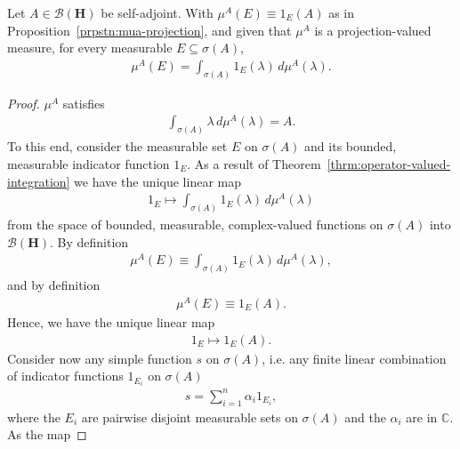 \begin{proposition}
    \label{prpstn:mua-indicator-integral}
    \leanok
    Let $A \in \mathcal{B}(\mathbf{H})$ be self-adjoint. With $\mu^A(E) \equiv 1_E(A)$ as in Proposition~\ref{prpstn:mua-projection}, and given that $\mu^A$ is a projection-valued measure, for every measurable $E \subseteq \sigma(A)$,
    \begin{align}
        \mu^A(E) = \int_{\sigma(A)} 1_E(\lambda) \, d\mu^A(\lambda).
    \end{align}
\end{proposition}
\begin{proof}
    \leanok
$\mu^A$ satisfies
\begin{align}
    \int_{\sigma(A)} \lambda \, d\mu^A(\lambda) = A.
\end{align}
To this end, consider the measurable set $E$ on $\sigma(A)$ and its bounded, measurable indicator function $1_E$. As a result of Theorem~\ref{thrm:operator-valued-integration} we have the unique linear map
\begin{align}
    1_E \longmapsto \int_{\sigma(A)} 1_E(\lambda) \, d\mu^A(\lambda)
\end{align}
from the space of bounded, measurable, complex-valued functions on $\sigma(A)$ into $\mathcal{B}(\mathbf{H})$. By definition
\begin{align}
    \mu^A(E) \equiv \int_{\sigma(A)} 1_E(\lambda) \, d\mu^A(\lambda),
\end{align}
and by definition
\begin{align}
    \mu^A(E) \equiv 1_E(A).
\end{align}
Hence, we have the unique linear map
\begin{align}
    1_E \longmapsto 1_E(A).
\end{align}
Consider now any simple function $s$ on $\sigma(A)$, i.e. any finite linear combination of indicator functions $1_{E_i}$ on $\sigma(A)$
\begin{align}
    s = \sum_{i = 1}^n \alpha_i 1_{E_i},
\end{align}
where the $E_i$ are pairwise disjoint measurable sets on $\sigma(A)$ and the $\alpha_i$ are in $\mathbb{C}$. As the map

\end{proof}
